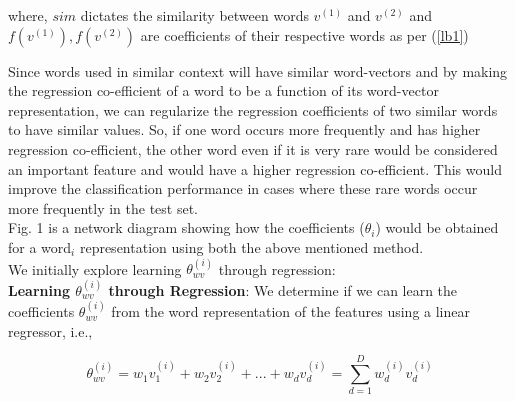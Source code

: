where, $sim$ dictates the similarity between words $v^{(1)}$ and $v^{(2)}$ and $ f(v^{(1)}), f(v^{(2)})$ are coefficients of their respective words as per (\ref{lb1})


Since words used in similar context will have similar word-vectors and by making the regression co-efficient of a word to be a function of its word-vector representation, we can regularize the regression coefficients of two similar words to have similar values. So, if one word occurs more frequently and has higher regression co-efficient, the other word even if it is very rare would be considered an important feature and would have a higher regression co-efficient. This would improve the classification performance in cases where these rare words occur more frequently in the test set.\\


\noindent Fig. 1 is a network diagram showing how the coefficients ($\theta_{i}$) would be obtained for a word$_{i}$ representation using both the above mentioned method.\\

\noindent We initially explore learning $\theta_{wv}^{(i)}$ through regression:\\



\noindent\textbf{Learning $\theta_{wv}^{(i)}$ through Regression}: We determine if we can learn the coefficients $\theta_{wv}^{(i)}$ from the word representation of the features using a linear regressor, i.e., 

\begin{equation}
\theta_{wv}^{(i)} = w_{1}v_{1}^{(i)} + w_{2}v_{2}^{(i)} + ... + w_{d}v_{d}^{(i)} = \sum_{d=1}^{D} w_{d}^{(i)}v_{d}^{(i)}
\end{equation}

